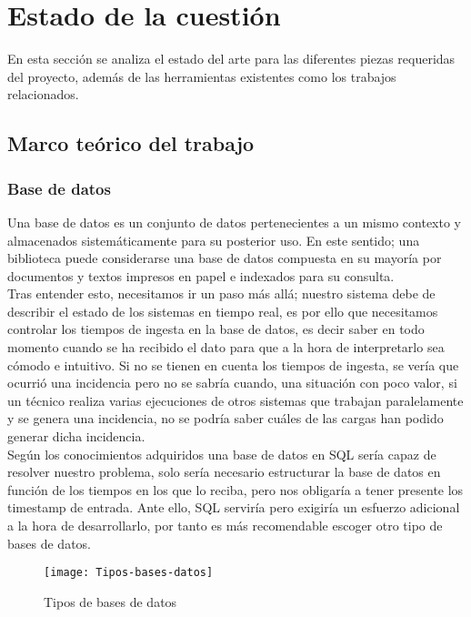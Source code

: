 \documentclass[ spanish, a4paper, 12pt, oneside]{report}
\begin{document}
\chapter{Estado de la cuestión}

En esta sección se analiza el estado del arte para las diferentes piezas requeridas del proyecto, además de las herramientas existentes 
como los trabajos relacionados.\\


\section{Marco teórico del trabajo}

\subsection{Base de datos}
Una base de datos es un conjunto de datos pertenecientes a un mismo contexto y almacenados sistemáticamente para su posterior uso. En este sentido; 
una biblioteca puede considerarse una base de datos compuesta en su mayoría por documentos y textos impresos en papel e indexados para su consulta.\\

Tras entender esto, necesitamos ir un paso más allá; nuestro sistema debe de describir el estado de los sistemas en tiempo real, es por ello que necesitamos 
controlar los tiempos de ingesta en la base de datos, es decir saber en todo momento cuando se ha recibido el dato para que a la hora de interpretarlo 
sea cómodo e intuitivo. Si no se tienen en cuenta los tiempos de ingesta, se vería que ocurrió una incidencia pero no se sabría cuando, una situación con poco valor, 
si un técnico realiza varias ejecuciones de otros sistemas que trabajan paralelamente y se genera una incidencia, no se podría saber cuáles de las cargas han podido 
generar dicha incidencia. \\

Según los conocimientos adquiridos una base de datos en SQL sería capaz de resolver nuestro problema, solo sería necesario estructurar la base de datos en 
función de los tiempos en los que lo reciba, pero nos obligaría a tener presente los timestamp de entrada. Ante ello, SQL serviría pero exigiría un esfuerzo adicional a la hora de 
desarrollarlo, por tanto es más recomendable escoger otro tipo de bases de datos. \\

\begin{figure}[!h]
   \centering
   \texttt{[image: Tipos-bases-datos]}\\
      \caption{\label{fig: Tipos de bases de datos} Tipos de bases de datos}
\end{figure}
\end{document}
